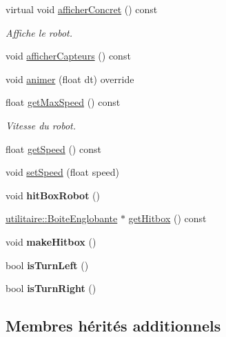\begin{DoxyCompactItemize}
\item 
virtual void \hyperlink{group__inf2990_gad63a8e09cc5ca8cc349f35e0901474e2}{afficher\-Concret} () const 
\begin{DoxyCompactList}\small\item\em Affiche le robot. \end{DoxyCompactList}\item 
void \hyperlink{group__inf2990_gacb5fe63e88cf810f3ecb584342f51c15}{afficher\-Capteurs} () const 
\item 
void \hyperlink{group__inf2990_ga20dbf7ef2ab44f32a5940e2bb76db5d0}{animer} (float dt) override
\item 
float \hyperlink{group__inf2990_ga994999022785e6186d60f9b219d6d832}{get\-Max\-Speed} () const 
\begin{DoxyCompactList}\small\item\em Vitesse du robot. \end{DoxyCompactList}\item 
float \hyperlink{group__inf2990_ga249b8466a20a60fbe7cc46f6e36af62a}{get\-Speed} () const 
\item 
void \hyperlink{group__inf2990_ga559df4c524257f953817bc6b22a467bc}{set\-Speed} (float speed)
\item 
\hypertarget{class_noeud_robot_a2eba2fceeaf59292ec090a03dde2fad1}{void {\bfseries hit\-Box\-Robot} ()}\label{class_noeud_robot_a2eba2fceeaf59292ec090a03dde2fad1}

\item 
\hyperlink{structutilitaire_1_1_boite_englobante}{utilitaire\-::\-Boite\-Englobante} $\ast$ \hyperlink{group__inf2990_ga1b9729298f653ae025f91d362764465e}{get\-Hitbox} () const 
\item 
\hypertarget{group__inf2990_gafe5ebc40e36ac92eb3e9957748ba93c1}{void {\bfseries make\-Hitbox} ()}\label{group__inf2990_gafe5ebc40e36ac92eb3e9957748ba93c1}

\item 
\hypertarget{group__inf2990_ga49f65d4d32c9abd0da2576c07bae97e4}{bool {\bfseries is\-Turn\-Left} ()}\label{group__inf2990_ga49f65d4d32c9abd0da2576c07bae97e4}

\item 
\hypertarget{group__inf2990_ga2a9dbfd2c32f254b20c81ae3f006be31}{bool {\bfseries is\-Turn\-Right} ()}\label{group__inf2990_ga2a9dbfd2c32f254b20c81ae3f006be31}

\end{DoxyCompactItemize}
\subsection*{Membres hérités additionnels}


